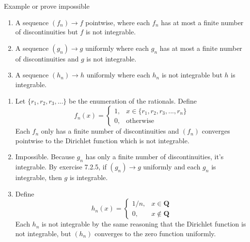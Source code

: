 \documentclass{oxmathproblems}
\begin{document}
\begin{questions}
\miquestion Example or prove impossible
\begin{enumerate}[label=(\alph*)]
  \item A sequence $(f_{n}) \to f$ pointwise, where each $f_{n}$ has at most a finite number of discontinuities but $f$ is not integrable.
  \item A sequence $(g_{n}) \to g$ uniformly where each $g_{n}$ has at most a finite number of discontinuities and $g$ is not integrable.
  \item A sequence $(h_{n}) \to h$ uniformly where each $h_{n}$ is not integrable but $h$ is integrable.
\end{enumerate}

\begin{solution}
  \begin{enumerate}[label=(\alph*)]
    \item Let $\{r_{1}, r_{2}, r_{3}, ...\}$ be the enumeration of the rationals. Define
      \[
          f_{n}(x) = \begin{cases}
            1, & x \in \{r_{1}, r_{2}, r_{3}, ..., r_{n}\} \\
            0, & \text{otherwise}
          \end{cases}
      \]
      Each $f_{n}$ only has a finite number of discontinuities and $(f_{n})$ converges pointwise to the Dirichlet function which is not integrable.
    \item Impossible. Because $g_{n}$ has only a finite number of discontinuities, it's integrable. By exercise 7.2.5, if $(g_{n}) \to g$ uniformly and each $g_{n}$
    is integrable, then $g$ is integrable.
    \item Define
      \[
          h_{n}(x) = \begin{cases}
            1/n, & x \in \textbf{Q}\\
            0, & x \notin \textbf{Q}
          \end{cases}
      \]
      Each $h_{n}$ is not integrable by the same reasoning that the Dirichlet function is not integrable, but $(h_{n})$ converges to the
      zero function uniformly.
  \end{enumerate}
\end{solution}

\end{questions}
\end{document}
